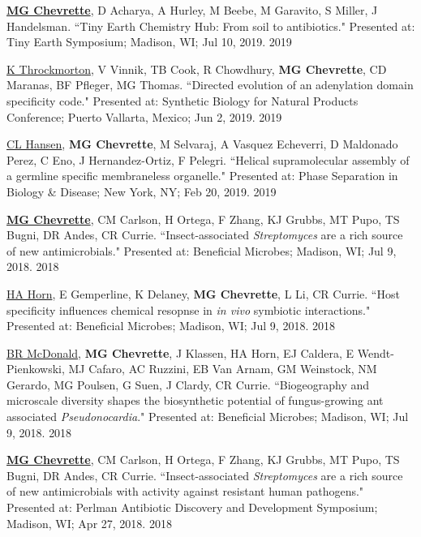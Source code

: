
\begin{cvpubs}

\cvpub
{\underline{\textbf{MG Chevrette}}, D Acharya, A Hurley, M Beebe, M Garavito, S Miller, J Handelsman. ``Tiny Earth Chemistry Hub: From soil to antibiotics." Presented at: Tiny Earth Symposium; Madison, WI; Jul 10, 2019.}
{2019}

\cvpub
{\underline{K Throckmorton}, V Vinnik, TB Cook, R Chowdhury, \textbf{MG Chevrette}, CD Maranas, BF Pfleger, MG Thomas. ``Directed evolution of an adenylation domain specificity code." Presented at: Synthetic Biology for Natural Products Conference; Puerto Vallarta, Mexico; Jun 2, 2019.}
{2019}

\cvpub
{\underline{CL Hansen}, \textbf{MG Chevrette}, M Selvaraj, A Vasquez Echeverri, D Maldonado Perez, C Eno, J Hernandez-Ortiz, F Pelegri. ``Helical supramolecular assembly of a germline specific membraneless organelle." Presented at: Phase Separation in Biology \& Disease; New York, NY; Feb 20, 2019.}
{2019}

\cvpub
{\underline{\textbf{MG Chevrette}}, CM Carlson, H Ortega, F Zhang, KJ Grubbs, MT Pupo, TS Bugni, DR Andes, CR Currie. ``Insect-associated \textit{Streptomyces} are a rich source of new antimicrobials." Presented at: Beneficial Microbes; Madison, WI; Jul 9, 2018.}
{2018}

\cvpub
{\underline{HA Horn}, E Gemperline, K Delaney, \textbf{MG Chevrette}, L Li, CR Currie. ``Host specificity influences chemical resopnse in \textit{in vivo} symbiotic interactions." Presented at: Beneficial Microbes; Madison, WI; Jul 9, 2018.}
{2018}

\cvpub
{\underline{BR McDonald}, \textbf{MG Chevrette}, J Klassen, HA Horn, EJ Caldera, E Wendt-Pienkowski, MJ Cafaro, AC Ruzzini, EB Van Arnam, GM Weinstock, NM Gerardo, MG Poulsen, G Suen, J Clardy, CR Currie. ``Biogeography and microscale diversity shapes the biosynthetic potential of fungus-growing ant associated \textit{Pseudonocardia}." Presented at: Beneficial Microbes; Madison, WI; Jul 9, 2018.}
{2018}

\end{cvpubs} \begin{cvpubs}

\cvpub
{\underline{\textbf{MG Chevrette}}, CM Carlson, H Ortega, F Zhang, KJ Grubbs, MT Pupo, TS Bugni, DR Andes, CR Currie. ``Insect-associated \textit{Streptomyces} are a rich source of new antimicrobials with activity against resistant human pathogens." Presented at: Perlman Antibiotic Discovery and Development Symposium; Madison, WI; Apr 27, 2018.}
{2018}


\end{cvpubs}
